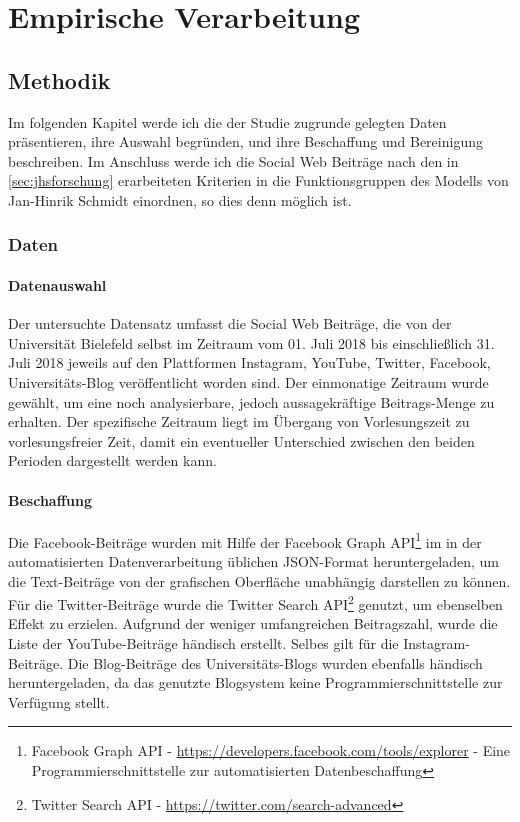 \chapter{Empirische Verarbeitung}
\label{chap:Empirie}

\section{Methodik}
\label{sec:Methodik}

Im folgenden Kapitel werde ich die der Studie zugrunde gelegten Daten präsentieren, ihre Auswahl begründen, und ihre Beschaffung und Bereinigung beschreiben. Im Anschluss werde ich die Social Web Beiträge nach den in \ref{sec:jhsforschung} erarbeiteten Kriterien in die Funktionsgruppen des Modells von Jan-Hinrik Schmidt einordnen, so dies denn möglich ist.

\subsection{Daten}
\label{sec:Daten}

\subsubsection{Datenauswahl}
\label{sec:Datenauswahl}

Der untersuchte Datensatz umfasst die Social Web Beiträge, die von der Universität Bielefeld selbst im Zeitraum vom 01. Juli 2018 bis einschließlich 31. Juli 2018 jeweils auf den Plattformen Instagram, YouTube, Twitter, Facebook, Universitäts-Blog veröffentlicht worden sind. Der einmonatige Zeitraum wurde gewählt, um eine noch analysierbare, jedoch aussagekräftige Beitrags-Menge zu erhalten. Der spezifische Zeitraum liegt im Übergang von Vorlesungszeit zu vorlesungsfreier Zeit, damit ein eventueller Unterschied zwischen den beiden Perioden dargestellt werden kann.

\subsubsection{Beschaffung}
\label{sec:Datenbeschaffung}

Die Facebook-Beiträge wurden mit Hilfe der Facebook Graph API\footnote{Facebook Graph API - \url{https://developers.facebook.com/tools/explorer} - Eine Programmierschnittstelle zur automatisierten Datenbeschaffung} im in der automatisierten Datenverarbeitung üblichen JSON-Format heruntergeladen, um die Text-Beiträge von der grafischen Oberfläche unabhängig darstellen zu können. Für die Twitter-Beiträge wurde die Twitter Search API\footnote{Twitter Search API - \url{https://twitter.com/search-advanced}} genutzt, um ebenselben Effekt zu erzielen. Aufgrund der weniger umfangreichen Beitragszahl, wurde die Liste der YouTube-Beiträge händisch erstellt. Selbes gilt für die Instagram-Beiträge. Die Blog-Beiträge des Universitäts-Blogs wurden ebenfalls händisch heruntergeladen, da das genutzte Blogsystem keine Programmierschnittstelle zur Verfügung stellt.

